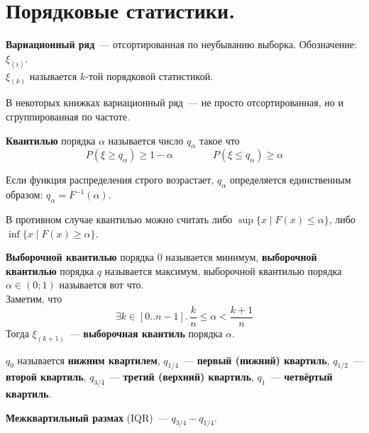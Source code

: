 \documentclass{article}
\begin{document}
    \section{Порядковые статистики.}
    \begin{definition}
        \textbf{Вариационный ряд}~--- отсортированная по неубыванию выборка. Обозначение: $\xi_{(i)}$.\\
        $\xi_{(k)}$ называется $k$-той порядковой статистикой.
    \end{definition}
    \begin{remark}
        В некоторых книжках вариационный ряд~--- не просто отсортированная, но и сгруппированная по частоте.
    \end{remark}
    \begin{definition}
        \textbf{Квантилью} порядка $\alpha$ называется число $q_\alpha$ такое что
        \[
        P(\xi\geqslant q_\alpha)\geqslant1-\alpha\qquad\qquad P(\xi\leqslant q_\alpha)\geqslant\alpha
        \]
    \end{definition}
    \begin{claim}
        Если функция распределения строго возрастает, $q_\alpha$ определяется единственным образом: $q_\alpha=F^{-1}(\alpha)$.
    \end{claim}
    \begin{claim}
        В противном случае квантилью можно считать либо $\sup\{x\mid F(x)\leqslant\alpha\}$, либо $\inf\{x\mid F(x)\geqslant\alpha\}$.
    \end{claim}
    \begin{definition}
        \textbf{Выборочной квантилью} порядка $0$ называется минимум, \textbf{выборочной квантилью} порядка $q$ называется максимум, выборочной квантилью порядка $\alpha\in(0;1)$ называется вот что.\\
        Заметим, что
        \[
        \exists k\in[0..n-1].\,\frac kn\leqslant\alpha<\frac{k+1}n
        \]
        Тогда $\xi_{(k+1)}$~--- \textbf{выборочная квантиль} порядка $\alpha$.
    \end{definition}
    \begin{definition}
        $q_0$ называется \textbf{нижним квартилем}, $q_{1/4}$~--- \textbf{первый (нижний) квартиль}, $q_{1/2}$~--- \textbf{второй квартиль}, $q_{3/4}$~--- \textbf{третий (верхний) квартиль}, $q_1$~--- \textbf{четвёртый квартиль}.
    \end{definition}
    \begin{definition}
        \textbf{Межквартильный размах} (IQR)~--- $q_{3/4}-q_{1/4}$.
    \end{definition}
\end{document}
